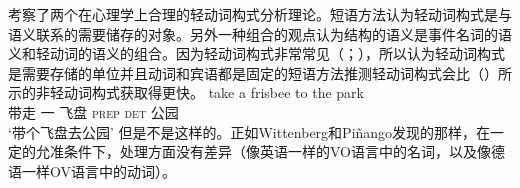 \begin{exe}
\begin{xlist}[iv.]
\begin{exe}
\begin{xlist}[iv.]
\citet{WP2011a}考察了两个在心理学上合理的轻动词构式分析理论。短语方法认为轻动词构式是与语义联系的需要储存的对象\citep{Goldberg2003a}。另外一种组合的观点认为结构的语义是事件名词的语义和轻动词的语义的组合\citep{Grimshaw97a-u,Butt2003a-u,Jackendoff2002a-u,CJ2005a,MuellerPersian,BPW2008a-u}。因为轻动词构式非常常见（\citealp*{Pinango:2006qy}；\citealp[]{WP2011a}），所以认为轻动词构式是需要存储的单位并且动词和宾语都是固定的短语方法推测轻动词构式会比（）所示的非轻动词构式获取得更快\citep[]{WP2011a}。
\ea
\gll take a frisbee to the park\\
     带走 一 飞盘 \textsc{prep} \textsc{det} 公园\\
\glt `带个飞盘去公园'
\z
但是不是这样的。正如Wittenberg和Piñango发现的那样，在一定的允准条件下，处理方面没有差异（像英语一样的VO语言中的名词，以及像德语一样OV语言中的动词）。


\end{xlist}
\end{exe}
\end{xlist}
\end{exe}
